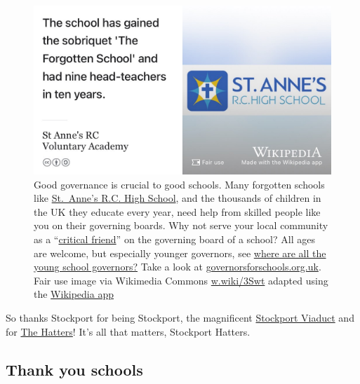 \documentclass[
]{book}
\begin{document}
\begin{figure}

{\centering \includegraphics[width=1\linewidth]{images/st-annes-rc-high-school} 

}

\caption{Good governance is crucial to good schools. Many forgotten schools like \href{https://en.wikipedia.org/wiki/St_Anne\%27s_RC_Voluntary_Academy}{St.~Anne's R.C. High School}, and the thousands of children in the UK they educate every year, need help from skilled people like you on their governing boards. Why not serve your local community as a ``\href{https://en.wikipedia.org/wiki/Critical_friend}{critical friend}'' on the governing board of a school? All ages are welcome, but especially younger governors, see \href{https://www.theguardian.com/teacher-network/2015/mar/11/young-people-school-governors}{where are all the young school governors?} \citep{youngovernors} Take a look at \href{https://governorsforschools.org.uk/}{governorsforschools.org.uk}. Fair use image via Wikimedia Commons \href{https://w.wiki/3Swt}{w.wiki/3Swt} adapted using the \href{https://apps.apple.com/us/app/wikipedia/id324715238}{Wikipedia app}}\label{fig:st-annes-fig}
\end{figure}



So thanks Stockport for being Stockport, the magnificent \href{https://en.wikipedia.org/wiki/Stockport_Viaduct}{Stockport Viaduct} and for \href{https://en.wikipedia.org/wiki/Stockport_County_F.C.}{The Hatters}! It's all that matters, Stockport Hatters. 🙏

\hypertarget{productivefailure}{%
\subsection{Thank you schools}\label{productivefailure}}
\end{document}
